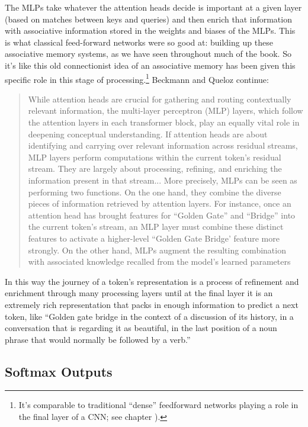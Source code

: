 The MLPs take whatever the attention heads decide is important at a given layer (based on matches between keys and queries) and then enrich that information with associative information stored in the weights and biases of the MLPs. This is what classical feed-forward networks were so good at: building up these associative memory systems, as we have seen throughout much of the book. So it's like this old connectionist idea of an associative memory has been given this specific role in this stage of processing.\footnote{It's comparable to traditional ``dense'' feedforward networks playing a role in the final layer of a CNN; see chapter ).} Beckmann and Queloz continue:
\begin{quote}
While attention heads are crucial for gathering and routing contextually relevant information, the multi-layer perceptron (MLP) layers, which follow the attention layers in each transformer block, play an equally vital role in deepening conceptual understanding. If attention heads are about identifying and carrying over relevant information across residual streams, MLP layers perform computations within the current token’s residual stream. They are largely about processing, refining, and enriching the information present in that stream... More precisely, MLPs can be seen as performing two functions. On the one hand, they combine the diverse pieces of information retrieved by attention layers. For instance, once an attention head has brought features for ``Golden Gate'' and ``Bridge'' into the current token’s stream, an MLP layer must combine these distinct features to activate a higher-level ``Golden Gate Bridge' feature more strongly. On the other hand, MLPs augment the resulting combination with associated knowledge recalled from the model’s learned parameters
\end{quote}

In this way the journey of a token's representation is a process of refinement and enrichment through many processing layers until at the final layer it is an extremely rich representation that packs in enough information to predict a next token, like ``Golden gate bridge in the context of a discussion of its history, in a conversation that is regarding it as beautiful, in the last position of a noun phrase that would normally be followed by a verb.''

\subsection{Softmax Outputs}\label{llmOutput}

